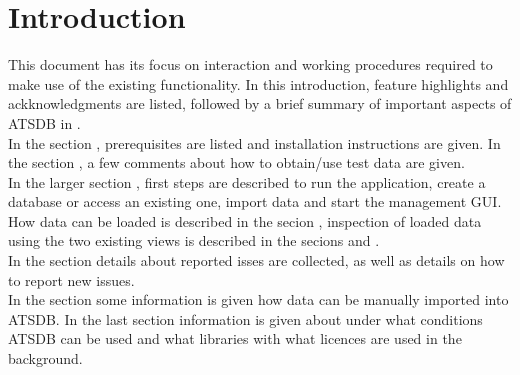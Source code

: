 \chapter{Introduction}

This document has its focus on interaction and working procedures required to make use of the existing
functionality. In this introduction, feature highlights and ackknowledgments are listed, followed by a brief summary of important aspects of  ATSDB in . \\

In the section , prerequisites are listed and installation instructions are given. In the section , a few comments about how to obtain/use test data are given. \\

In the larger section , first steps are described to run the application, create a database or access an existing one, import data and start the management GUI. \\

How data can be loaded is described in the secion , inspection of loaded data using the two existing views is described in the secions  and . \\

In the section  details about reported isses are collected, as well as details on how to report new issues. \\

In the section  some information is given how data can be manually imported into ATSDB. In the last section  information is given about under what conditions ATSDB can be used and what libraries with what licences are used in the background.












